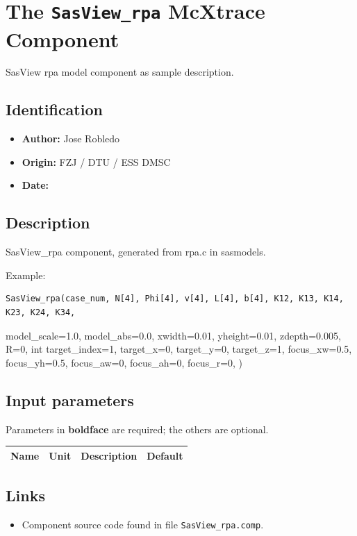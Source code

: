 \section{The \texttt{SasView\_rpa} McXtrace Component}
SasView rpa model component as sample description.

\subsection*{Identification}
\begin{itemize}
  \item \textbf{Author:} Jose Robledo
  \item \textbf{Origin:} FZJ / DTU / ESS DMSC
  \item \textbf{Date:} 
\end{itemize}

\subsection*{Description}
SasView\_rpa component, generated from rpa.c in sasmodels.

Example:

\begin{verbatim}
SasView_rpa(case_num, N[4], Phi[4], v[4], L[4], b[4], K12, K13, K14, K23, K24, K34,
\end{verbatim}

model\_scale=1.0, model\_abs=0.0, xwidth=0.01, yheight=0.01, zdepth=0.005, R=0, int target\_index=1, target\_x=0, target\_y=0, target\_z=1, focus\_xw=0.5, focus\_yh=0.5, focus\_aw=0, focus\_ah=0, focus\_r=0, )

\subsection*{Input parameters}
Parameters in \textbf{boldface} are required; the others are optional.

\begin{longtable}{p{}p{}p{}p{}}
\toprule
\textbf{Name} & \textbf{Unit} & \textbf{Description} & \textbf{Default} \\
\midrule
\endhead
\bottomrule
\end{longtable}

\subsection*{Links}
\begin{itemize}
  \item Component source code found in file \texttt{SasView\_rpa.comp}.
\end{itemize}

